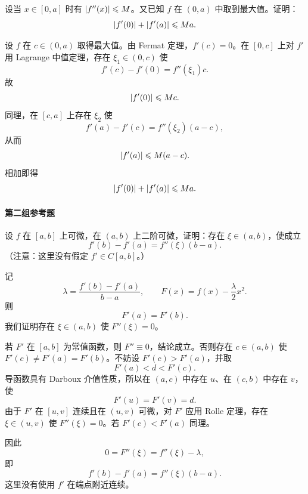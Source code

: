 \begin{xreferenceproblem}[18]
设当 $x\in[0,a]$ 时有 $\lvert f''(x)\rvert\leqslant M$。又已知 $f$ 在 $(0,a)$ 中取到最大值。证明：
\[
  \lvert f'(0)\rvert+\lvert f'(a)\rvert\leqslant Ma.
\]
\end{xreferenceproblem}
\begin{xsolution}
设 $f$ 在 $c\in(0,a)$ 取得最大值。由 Fermat 定理，$f'(c)=0$。在 $[0,c]$ 上对 $f'$ 用 Lagrange 中值定理，存在 $\xi_1\in(0,c)$ 使
\[
  f'(c)-f'(0)=f''(\xi_1)c.
\]
故
\[
  \lvert f'(0)\rvert\leqslant Mc.
\]
同理，在 $[c,a]$ 上存在 $\xi_2$ 使
\[
  f'(a)-f'(c)=f''(\xi_2)(a-c),
\]
从而
\[
  \lvert f'(a)\rvert\leqslant M(a-c).
\]
相加即得
\[
  \lvert f'(0)\rvert+\lvert f'(a)\rvert\leqslant Ma.
\]
\end{xsolution}


\paragraph{第二组参考题}

\begin{xreferenceproblem}[1]
设 $f$ 在 $[a,b]$ 上可微，在 $(a,b)$ 上二阶可微，证明：存在 $\xi\in(a,b)$，使成立
\[
  f'(b)-f'(a)=f''(\xi)(b-a).
\]
（注意：这里没有假定 $f'\in C[a,b]$。）
\end{xreferenceproblem}
\begin{xsolution}
记
\[
  \lambda=\frac{f'(b)-f'(a)}{b-a},
  \qquad
  F(x)=f(x)-\frac{\lambda}{2}x^2.
\]
则
\[
  F'(a)=F'(b).
\]
我们证明存在 $\xi\in(a,b)$ 使 $F''(\xi)=0$。

若 $F'$ 在 $[a,b]$ 为常值函数，则 $F''\equiv0$，结论成立。否则存在 $c\in(a,b)$ 使 $F'(c)\neq F'(a)=F'(b)$。不妨设 $F'(c)>F'(a)$，并取
\[
  F'(a)<d<F'(c).
\]
导函数具有 Darboux 介值性质，所以在 $(a,c)$ 中存在 $u$、在 $(c,b)$ 中存在 $v$，使
\[
  F'(u)=F'(v)=d.
\]
由于 $F'$ 在 $[u,v]$ 连续且在 $(u,v)$ 可微，对 $F'$ 应用 Rolle 定理，存在 $\xi\in(u,v)$ 使 $F''(\xi)=0$。若 $F'(c)<F'(a)$ 同理。

因此
\[
  0=F''(\xi)=f''(\xi)-\lambda,
\]
即
\[
  f'(b)-f'(a)=f''(\xi)(b-a).
\]
这里没有使用 $f'$ 在端点附近连续。
\end{xsolution}


